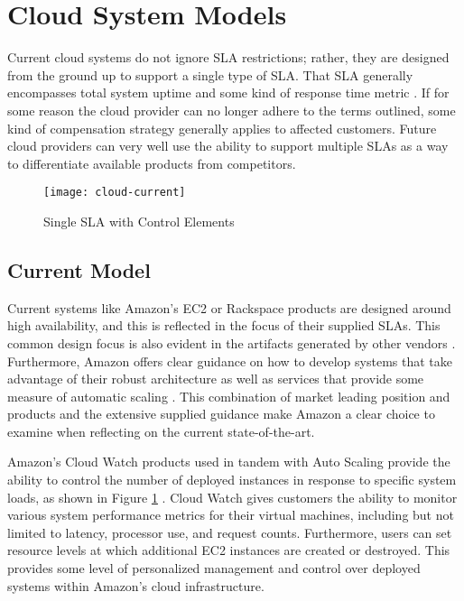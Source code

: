\section{Cloud System Models}\label{sec:cloud-models}
Current cloud systems do not ignore SLA restrictions; rather, they are designed from the ground up to support a single type of SLA.  That SLA generally encompasses total system uptime and some kind of response time metric \cite{ctrl:amazon-sla,ctrl:rackspace-sla}.  If for some reason the cloud provider can no longer adhere to the terms outlined, some kind of compensation strategy generally applies to affected customers.  Future cloud providers can very well use the ability to support multiple SLAs as a way to differentiate available products from competitors.

\begin{figure}[!t]
\centering
\texttt{[image: cloud-current]}
\caption{Single SLA with Control Elements}
\label{fig:current-cloud-model}
\end{figure}

\subsection{Current Model}
Current systems like Amazon's EC2 or Rackspace products are designed around high availability, and this is reflected in the focus of their supplied SLAs.  This common design focus is also evident in the artifacts generated by other vendors \cite{ctrl:google-arch}.  Furthermore, Amazon offers clear guidance on how to develop systems that take advantage of their robust architecture as well as services that provide some measure of automatic scaling \cite{ctrl:amazon-best-practice,ctrl:amazon-fault-tolerant}.  This combination of market leading position and products and the extensive supplied guidance make Amazon a clear choice to examine when reflecting on the current state-of-the-art.

Amazon's Cloud Watch products used in tandem with Auto Scaling provide the ability to control the number of deployed instances in response to specific system loads, as shown in Figure \ref{fig:current-cloud-model} \cite{ctrl:amazon-cloud-watch,ctrl:amazon-auto-scale}.  Cloud Watch gives customers the ability to monitor various system performance metrics for their virtual machines, including but not limited to latency, processor use, and request counts.  Furthermore, users can set resource levels at which additional EC2 instances are created or destroyed.  This provides some level of personalized management and control over deployed systems within Amazon's cloud infrastructure.

